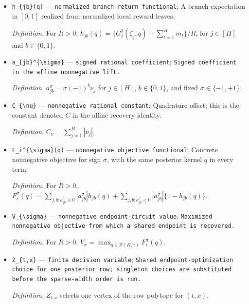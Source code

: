 \documentclass{article}
\begin{document}
\begin{itemize}
  \item \texttt{h\_\allowbreak{}\{jb\}\allowbreak{}(q)} --- \texttt{normalized branch-\allowbreak{}return functional}; A branch expectation in \(\left[0,1\right]\) realized from normalized local reward leaves.
  \par\smallskip\noindent\emph{Definition.} For \(R>0\), \(h_{jb}(q)=\{G_i^b(\zeta_j,q)-\sum_{t=1}^H m_t\}/R\), for \(j\in[H]\) and \(b\in\{0,1\}\).
  \item \texttt{a\_\allowbreak{}\{jb\}\allowbreak{}\textasciicircum{}\{\textbackslash{}\allowbreak{}sigma\}\allowbreak{}} --- \texttt{signed rational coefficient}; \texttt{Signed coefficient in the affine nonnegative lift.}
  \par\smallskip\noindent\emph{Definition.} \(a_{jb}^{\sigma}=\sigma(-1)^b\nu_j\) for \(j\in[H]\), \(b\in\{0,1\}\), and fixed \(\sigma\in\{-1,+1\}\).
  \item \texttt{C\_\allowbreak{}\{\textbackslash{}\allowbreak{}nu\}\allowbreak{}} --- \texttt{nonnegative rational constant}; Quadrature offset; this is the constant denoted \(C\) in the affine recovery identity.
  \par\smallskip\noindent\emph{Definition.} \(C_{\nu}=\sum_{j=1}^H|\nu_j|\).
  \item \texttt{F\_\allowbreak{}i\textasciicircum{}\{\textbackslash{}\allowbreak{}sigma\}\allowbreak{}(q)} --- \texttt{nonnegative objective functional}; Concrete nonnegative objective for sign \(\sigma\), with the same posterior kernel \(q\) in every term.
  \par\smallskip\noindent\emph{Definition.} For \(R>0\), \(F_i^{\sigma}(q)=\sum_{j,b:a_{jb}^{\sigma}\ge0}|a_{jb}^{\sigma}|h_{jb}(q)+\sum_{j,b:a_{jb}^{\sigma}<0}|a_{jb}^{\sigma}|\{1-h_{jb}(q)\}\).
  \item \texttt{V\_\allowbreak{}\{\textbackslash{}\allowbreak{}sigma\}\allowbreak{}} --- \texttt{nonnegative endpoint-\allowbreak{}circuit value}; \texttt{Maximized nonnegative objective from which a shared endpoint is recovered.}
  \par\smallskip\noindent\emph{Definition.} For \(R>0\), \(V_{\sigma}=\max_{q\in\mathcal B(K,\tau)}F_i^{\sigma}(q)\).
  \item \texttt{Z\_\allowbreak{}\{t,\allowbreak{}x\}\allowbreak{}} --- \texttt{finite decision variable}; \texttt{Shared endpoint-\allowbreak{}optimization choice for one posterior row;\allowbreak{} singleton choices are substituted before the sparse-\allowbreak{}width order is run.}
  \par\smallskip\noindent\emph{Definition.} \(Z_{t,x}\) selects one vertex of the row polytope for \((t,x)\).

\end{itemize}
\end{document}
